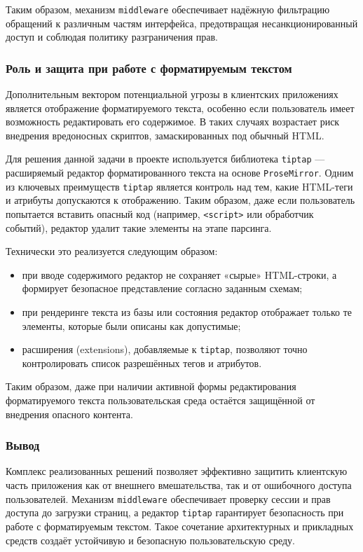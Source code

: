 Таким образом, механизм \texttt{middleware} обеспечивает надёжную фильтрацию обращений к различным частям интерфейса, предотвращая несанкционированный доступ и соблюдая политику разграничения прав.

\subsubsection{Роль и защита при работе с форматируемым текстом}
Дополнительным вектором потенциальной угрозы в клиентских приложениях является отображение форматируемого текста, особенно если пользователь имеет возможность редактировать его содержимое. В таких случаях возрастает риск внедрения вредоносных скриптов, замаскированных под обычный HTML.

Для решения данной задачи в проекте используется библиотека \texttt{tiptap} — расширяемый редактор форматированного текста на основе \texttt{ProseMirror}. Одним из ключевых преимуществ \texttt{tiptap} является контроль над тем, какие HTML-теги и атрибуты допускаются к отображению. Таким образом, даже если пользователь попытается вставить опасный код (например, \texttt{<script>} или обработчик событий), редактор удалит такие элементы на этапе парсинга.

Технически это реализуется следующим образом:
\begin{itemize}
  \item при вводе содержимого редактор не сохраняет «сырые» HTML-строки, а формирует безопасное представление согласно заданным схемам;
  \item при рендеринге текста из базы или состояния редактор отображает только те элементы, которые были описаны как допустимые;
  \item расширения (extensions), добавляемые к \texttt{tiptap}, позволяют точно контролировать список разрешённых тегов и атрибутов.
\end{itemize}

Таким образом, даже при наличии активной формы редактирования форматируемого текста пользовательская среда остаётся защищённой от внедрения опасного контента.

\subsubsection{Вывод}

Комплекс реализованных решений позволяет эффективно защитить клиентскую часть приложения как от внешнего вмешательства, так и от ошибочного доступа пользователей. Механизм \texttt{middleware} обеспечивает проверку сессии и прав доступа до загрузки страниц, а редактор \texttt{tiptap} гарантирует безопасность при работе с форматируемым текстом. Такое сочетание архитектурных и прикладных средств создаёт устойчивую и безопасную пользовательскую среду.
